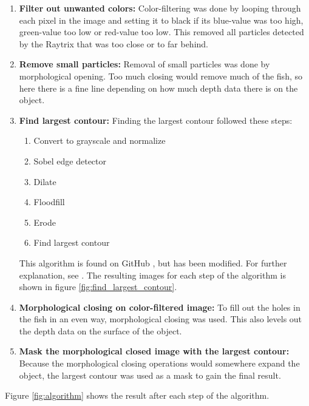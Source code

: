 \begin{enumerate}
    \item \textbf{Filter out unwanted colors:}
    Color-filtering was done by looping through each pixel in the image and setting it to black if its blue-value was too high, green-value too low or red-value too low. This removed all particles detected by the Raytrix that was too close or to far behind. 
    
    \item \textbf{Remove small particles:}
    Removal of small particles was done by morphological opening. Too much closing would remove much of the fish, so here there is a fine line depending on how much depth data there is on the object.
    
    \item \textbf{Find largest contour:} 
    Finding the largest contour followed these steps: 
    \begin{enumerate}[label*=\arabic*.]
        \item Convert to grayscale and normalize
        \item Sobel edge detector
        \item Dilate
        \item Floodfill
        \item Erode
        \item Find largest contour
    \end{enumerate}
    This algorithm is found on GitHub \cite{website:largest_contour_code_github}, but has been modified. For further explanation, see \cite{website:largest_contour_code_explanation}.
    The resulting images for each step of the algorithm is shown in figure \ref{fig:find_largest_contour}.
    
    \item \textbf{Morphological closing on color-filtered image:}
    To fill out the holes in the fish in an even way, morphological closing was used. This also levels out the depth data on the surface of the object.
    
    \item \textbf{Mask the morphological closed image with the largest contour:}
    Because the morphological closing operations would somewhere expand the object, the largest contour was used as a mask to gain the final result. 
\end{enumerate}

Figure \ref{fig:algorithm} shows the result after each step of the algorithm.

